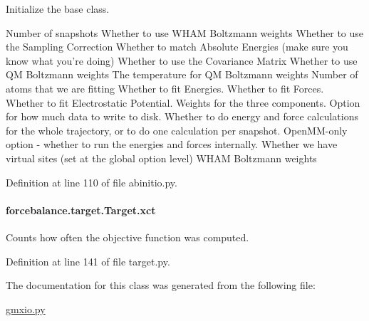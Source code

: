 Initialize the base class. 

Number of snapshots Whether to use W\-H\-A\-M Boltzmann weights Whether to use the Sampling Correction Whether to match Absolute Energies (make sure you know what you're doing) Whether to use the Covariance Matrix Whether to use Q\-M Boltzmann weights The temperature for Q\-M Boltzmann weights Number of atoms that we are fitting Whether to fit Energies. Whether to fit Forces. Whether to fit Electrostatic Potential. Weights for the three components. Option for how much data to write to disk. Whether to do energy and force calculations for the whole trajectory, or to do one calculation per snapshot. Open\-M\-M-\/only option -\/ whether to run the energies and forces internally. Whether we have virtual sites (set at the global option level) W\-H\-A\-M Boltzmann weights 

Definition at line 110 of file abinitio.\-py.

\hypertarget{classforcebalance_1_1target_1_1Target_aad2e385cfbf7b4a68f1c2cb41133fe82}{
\paragraph[{xct}]{\setlength{\rightskip}{0pt plus 5cm}forcebalance.\-target.\-Target.\-xct\hspace{0.3cm}{\ttfamily [inherited]}}}\label{classforcebalance_1_1target_1_1Target_aad2e385cfbf7b4a68f1c2cb41133fe82}


Counts how often the objective function was computed. 



Definition at line 141 of file target.\-py.



The documentation for this class was generated from the following file\-:\begin{DoxyCompactItemize}
\item 
\hyperlink{gmxio_8py}{gmxio.\-py}\end{DoxyCompactItemize}
